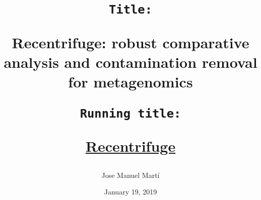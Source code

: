 \documentclass{GR}
\begin{document}
\title{
	\vspace*{0mm} %
	\singlespacing
	\begin{flushleft}
		\texttt{\large Title:} \\
	\end{flushleft}
	\vspace*{2mm}
	{\huge\titlefont Recentrifuge: robust comparative analysis
		 and contamination removal for metagenomics}\\
	\vspace*{0mm}
	\begin{flushleft}
		\texttt{\large Running title:} \\
	\end{flushleft}
	\vspace*{0mm}
	\Huge \href{http://www.recentrifuge.org}{\rtitlefont Recentrifuge} 
	\vspace*{4mm}
	}

\doublespacing

\author[1,\#]{\mdseries\Large\authorfont Jose Manuel Martí}
\begin{NoHyper}
	\relax\renewcommand\thefootnote{\#}
\end{NoHyper}


\date{January 19, 2019}

\maketitle

\end{document}
